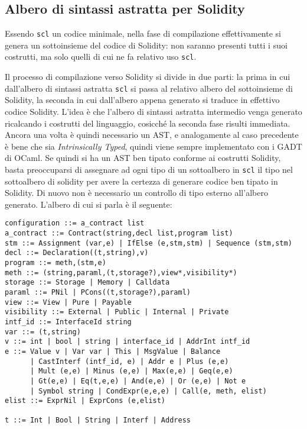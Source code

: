 \documentclass[]{article}
\begin{document}
\hypertarget{albero-di-sintassi-astratta-per-solidity}{%
\subsection{Albero di sintassi astratta per
Solidity}\label{albero-di-sintassi-astratta-per-solidity}}

Essendo \texttt{scl} un codice minimale, nella fase di compilazione
effettivamente si genera un sottoinsieme del codice di Solidity: non
saranno presenti tutti i suoi costrutti, ma solo quelli di cui ne fa
relativo uso \texttt{scl}.

Il processo di compilazione verso Solidity si divide in due parti: la
prima in cui dall'albero di sintassi astratta \texttt{scl} si passa al
relativo albero del sottoinsieme di Solidity, la seconda in cui
dall'albero appena generato si traduce in effettivo codice Solidity.
L'idea è che l'albero di sintassi astratta intermedio venga generato
ricalcando i costrutti del linguaggio, cosicché la seconda fase risulti
immediata. Ancora una volta è quindi necessario un AST, e analogamente
al caso precedente è bene che sia \emph{Intrinsically Typed}, quindi
viene sempre implementato con i GADT di OCaml. Se quindi si ha un AST
ben tipato conforme ai costrutti Solidity, basta preoccuparsi di
assegnare ad ogni tipo di un sottoalbero in \texttt{scl} il tipo nel
sottoalbero di solidity per avere la certezza di generare codice ben
tipato in Solidity. Di nuovo non è necessario un controllo di tipo
esterno all'albero generato. L'albero di cui si parla è il seguente:

\begin{verbatim}
configuration ::= a_contract list
a_contract ::= Contract(string,decl list,program list)
stm ::= Assignment (var,e) | IfElse (e,stm,stm) | Sequence (stm,stm)
decl ::= Declaration((t,string),v)
program ::= meth,(stm,e)
meth ::= (string,paraml,(t,storage?),view*,visibility*)
storage ::= Storage | Memory | Calldata 
paraml ::= PNil | PCons((t,storage?),paraml)
view ::= View | Pure | Payable
visibility ::= External | Public | Internal | Private
intf_id ::= InterfaceId string
var ::= (t,string)
v ::= int | bool | string | interface_id | AddrInt intf_id
e ::= Value v | Var var | This | MsgValue | Balance 
      | CastInterf (intf_id, e) | Addr e | Plus (e,e) 
      | Mult (e,e) | Minus (e,e) | Max(e,e) | Geq(e,e)
      | Gt(e,e) | Eq(t,e,e) | And(e,e) | Or (e,e) | Not e 
      | Symbol string | CondExpr(e,e,e) | Call(e, meth, elist)
elist ::= ExprNil | ExprCons (e,elist)

t ::= Int | Bool | String | Interf | Address
\end{verbatim}
\end{document}
